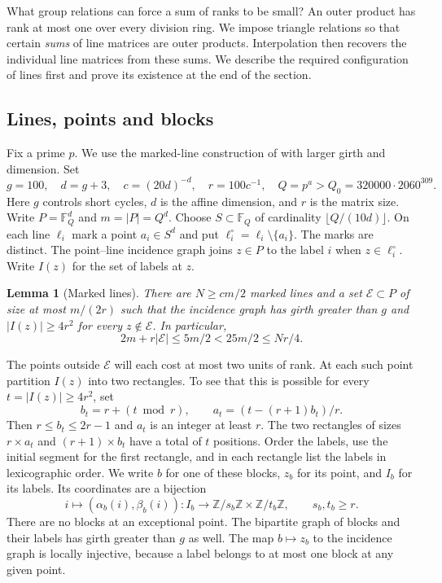 \documentclass[11pt,a4paper]{article}
\newtheorem{lemma}[theorem]{Lemma}
\numberwithin{equation}{section}
\begin{document}
What group relations can force a sum of ranks to be small? An outer product has rank at most one over every division ring. We impose triangle relations so that certain \emph{sums} of line matrices are outer products. Interpolation then recovers the individual line matrices from these sums. We describe the required configuration of lines first and prove its existence at the end of the section.

\subsection{Lines, points and blocks}

Fix a prime \(p\). We use the marked-line construction of \cite[Lemma~2.2]{r20} with larger girth and dimension. Set
\begin{equation}
 g=100,\quad d=g+3,\quad c=(20d)^{-d},\quad r=100c^{-1},\quad
 Q=p^a>Q_0=320000\cdot2060^{309}.
\end{equation}
Here \(g\) controls short cycles, \(d\) is the affine dimension, and \(r\) is the matrix size. Write \(P=\mathbb F_Q^d\) and \(m=|P|=Q^d\). Choose \(S\subset\mathbb F_Q\) of cardinality \(\lfloor Q/(10d)\rfloor\). On each line \(\ell_i\) mark a point \(a_i\in S^d\) and put \(\ell_i^\circ=\ell_i\setminus\{a_i\}\). The marks are distinct. The point--line incidence graph joins \(z\in P\) to the label \(i\) when \(z\in\ell_i^\circ\). Write \(I(z)\) for the set of labels at \(z\).

\begin{lemma}[Marked lines]
There are \(N\ge cm/2\) marked lines and a set \(\mathcal E\subset P\) of size at most \(m/(2r)\) such that the incidence graph has girth greater than \(g\) and \(|I(z)|\ge4r^2\) for every \(z\notin\mathcal E\). In particular,
\begin{equation}
 2m+r|\mathcal E|\le5m/2<25m/2\le Nr/4.
\end{equation}
\end{lemma}

The points outside \(\mathcal E\) will each cost at most two units of rank. At each such point partition \(I(z)\) into two rectangles. To see that this is possible for every \(t=|I(z)|\ge4r^2\), set
\[
 b_t=r+(t\bmod r),\qquad a_t=(t-(r+1)b_t)/r.
\]
Then \(r\le b_t\le2r-1\) and \(a_t\) is an integer at least \(r\). The two rectangles of sizes \(r\times a_t\) and \((r+1)\times b_t\) have a total of \(t\) positions. Order the labels, use the initial segment for the first rectangle, and in each rectangle list the labels in lexicographic order. We write \(b\) for one of these blocks, \(z_b\) for its point, and \(I_b\) for its labels. Its coordinates are a bijection
\begin{equation}
 i\longmapsto(\alpha_b(i),\beta_b(i)):
 I_b\longrightarrow\mathbb Z/s_b\mathbb Z\times\mathbb Z/t_b\mathbb Z,\qquad s_b,t_b\ge r .
\end{equation}
There are no blocks at an exceptional point. The bipartite graph of blocks and their labels has girth greater than \(g\) as well. The map \(b\mapsto z_b\) to the incidence graph is locally injective, because a label belongs to at most one block at any given point.
\end{document}
